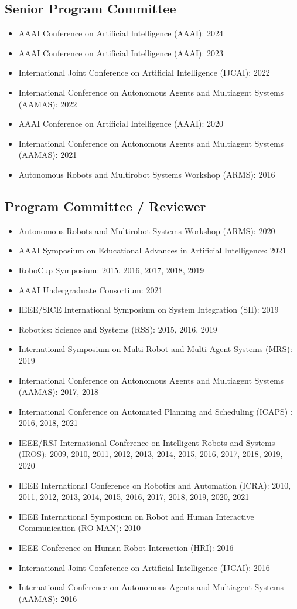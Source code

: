\documentclass[Times]{article}
\begin{document}
\subsection*{Senior Program Committee}
\begin{itemize}
  \item AAAI Conference on Artificial Intelligence (AAAI): 2024
  \item AAAI Conference on Artificial Intelligence (AAAI): 2023
  \item International Joint Conference on Artificial Intelligence (IJCAI): 2022
  \item International Conference on Autonomous Agents and Multiagent Systems
  (AAMAS): 2022
  \item AAAI Conference on Artificial Intelligence (AAAI): 2020
  \item International Conference on Autonomous Agents and Multiagent Systems
  (AAMAS): 2021
  \item Autonomous Robots and Multirobot Systems Workshop (ARMS): 2016
\end{itemize}

\subsection*{Program Committee / Reviewer}
\begin{itemize}
 \item Autonomous Robots and Multirobot Systems Workshop (ARMS): 2020
 \item AAAI Symposium on Educational Advances in Artificial Intelligence: 2021
 \item RoboCup Symposium: 2015, 2016, 2017, 2018, 2019
 \item AAAI Undergraduate Consortium: 2021
 \item IEEE/SICE International Symposium on System Integration (SII): 2019
 \item Robotics: Science and Systems (RSS): 2015, 2016, 2019
 \item International Symposium on Multi-Robot and Multi-Agent Systems (MRS): 2019
 \item International Conference on Autonomous Agents and Multiagent Systems
(AAMAS): 2017, 2018
\item International Conference on Automated Planning and Scheduling (ICAPS)
 : 2016, 2018, 2021
 \item IEEE/RSJ International Conference on Intelligent Robots and Systems
(IROS): 2009, 2010, 2011, 2012, 2013, 2014, 2015, 2016, 2017, 2018, 2019, 2020
\item IEEE International Conference on Robotics and Automation (ICRA): 2010,
  2011, 2012, 2013, 2014, 2015, 2016, 2017, 2018, 2019, 2020, 2021
\item IEEE International Symposium on Robot and Human Interactive Communication
  (RO-MAN): 2010
 \item IEEE Conference on Human-Robot Interaction (HRI): 2016
 \item International Joint Conference on Artificial Intelligence (IJCAI): 2016
 \item International Conference on Autonomous Agents and Multiagent Systems
(AAMAS): 2016
\end{itemize}
\end{document}
